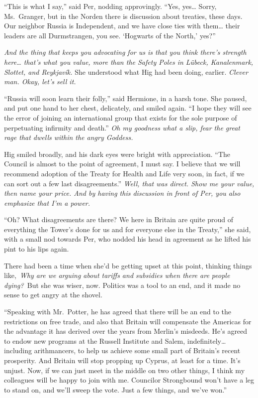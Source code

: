 ``This is what I say,'' said Per, nodding approvingly. ``Yes,
yes\ldots{} Sorry, Ms.~Granger, but in the Norden there is discussion
about treaties, these days. Our neighbor Russia is Independent, and we
have close ties with them\ldots{} their leaders are all Durmstrangen,
you see. `Hogwarts of the North,' yes?''

\emph{And the thing that keeps you advocating for us is that you think
there's strength here\ldots{} that's what you value, more than the
Safety Poles in Lübeck, Kanalenmark, Slottet, and Reykjavík.} She
understood what Hig had been doing, earlier. \emph{Clever man. Okay,
let's sell it.}

``Russia will soon learn their folly,'' said Hermione, in a harsh tone.
She paused, and put one hand to her chest, delicately, and smiled again.
``I hope they will see the error of joining an international group that
exists for the sole purpose of perpetuating infirmity and death.''
\emph{Oh my goodness what a slip, fear the great rage that dwells within
the angry Goddess.}

Hig smiled broadly, and his dark eyes were bright with appreciation.
``The Council is almost to the point of agreement, I must say. I believe
that we will recommend adoption of the Treaty for Health and Life very
soon, in fact, if we can sort out a few last disagreements.''
\emph{Well, that was direct. Show me your value, then name your price.
And by having this discussion in front of Per, you also emphasize that
I'm a power.}

``Oh? What disagreements are there? We here in Britain are quite proud
of everything the Tower's done for us and for everyone else in the
Treaty,'' she said, with a small nod towards Per, who nodded his head in
agreement as he lifted his pint to his lips again.

There had been a time when she'd be getting upset at this point,
thinking things like,~\emph{Why are we arguing about tariffs and
subsidies when there are people dying?}~But she was wiser, now. Politics
was a tool to an end, and it made no sense to get angry at the shovel.

``Speaking with Mr.~Potter, he has agreed that there will be an end to
the restrictions on free trade, and also that Britain will compensate
the Americas for the advantage it has derived over the years from
Merlin's misdeeds. He's agreed to endow new programs at the Russell
Institute and Salem, indefinitely\ldots{} including arithmancers, to
help us achieve some small part of Britain's recent prosperity. And
Britain will stop propping up Cyprus, at least for a time. It's unjust.
Now, if we can just meet in the middle on two other things, I think my
colleagues will be happy to join with me. Councilor Strongbound won't
have a leg to stand on, and we'll sweep the vote. Just a few things, and
we've won.''

